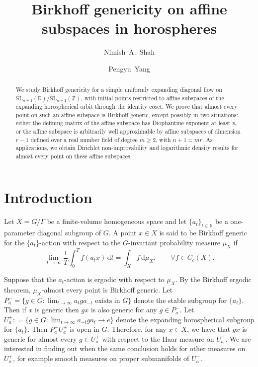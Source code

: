 \documentclass[12pt,reqno]{amsart}
\title{Birkhoff genericity on affine subspaces in horospheres}
\author[Shah]{Nimish~A.~Shah}
\author[Yang]{Pengyu~Yang}
\newcommand{\defeq}{\mathrel{\mathop:}=}
\numberwithin{equation}{section}
\theoremstyle{plain}
\theoremstyle{definition}
\theoremstyle{remark}
\newcommand{\R}{\mathbb{R}}
\newcommand{\de}{\mathrm{d}}
\begin{document}
\begin{abstract}
We study Birkhoff genericity for a simple uniformly expanding diagonal flow on
\(\mathrm{SL}_{n+1}(\mathbb R)/\mathrm{SL}_{n+1}(\mathbb Z)\), with initial points
restricted to affine subspaces of the expanding horospherical orbit through the identity coset. We prove that almost every point on such an affine subspace
is Birkhoff generic, except possibly in two situations: either the
defining matrix of the affine subspace has Diophantine exponent at least \(n\), or the affine subspace
is arbitrarily well approximable by affine subspaces of dimension \(r-1\)
defined over a real number field of degree \(m\ge 2\), with \(n+1=mr\).
As applications, we obtain Dirichlet non-improvability and logarithmic density
results for almost every point on these affine subspaces.
\end{abstract}

	
	\maketitle
	\tableofcontents
	\section{Introduction}


Let $X=G/\Gamma$ be a finite-volume homogeneous space and let
$\{a_t\}_{t\in\R}$ be a one-parameter diagonal subgroup of $G$.
A point $x\in X$ is said to be Birkhoff generic for the $\{a_t\}$-action with respect to the
$G$-invariant probability measure $\mu_X$ if
\[
\lim_{T\to\infty}\frac{1}{T}\int_0^T f(a_t x)\,\de t
=
\int_X f\,\de\mu_X,\qquad \forall f\in C_c(X).
\]


Suppose that the $a_t$-action is ergodic with respect to $\mu_X$. By the Birkhoff ergodic theorem, $\mu_X$-almost every point is Birkhoff generic. Let $P_a^-=\{g\in G:\lim_{t\to\infty} a_tga_{-t} \text{ exists in } G\}$ denote the stable subgroup for $\{a_t\}$. Then if $x$ is generic then $gx$ is also generic for any $g\in P_a^-$. Let $U_a^+\defeq \{g\in G: \lim_{t\to\infty} a_{-t}ga_t\to e\}$ denote the expanding horospherical subgroup for $\{a_t\}$. Then $P_a^-U_a^+$ is open in $G$. Therefore, for any $x\in X$, we have that $gx$ is generic for almost every $g\in U_a^+$ with respect to the Haar measure on $U_a^+$. We are interested in finding out when  the same conclusion holds for other measures on $U_a^+$, for example smooth measures on proper submanifolds of $U_a^+$. 
\end{document}
